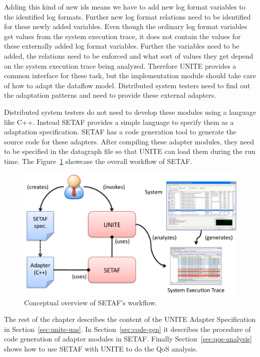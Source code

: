 Adding this kind of new ids means we have to add new log format 
variables to the identified log formats. Further new log format relations 
need to be identified for these newly added variables. Even though 
the ordinary log format variables get values from the system execution trace, 
it does not contain the values for these externally added log format 
variables.  Further the variables need to be added, the relations need 
to be enforced and what sort of values they get depend on the system 
execution trace being analyzed. Therefore UNITE provides a common 
interface for these task, but the implementation module should take 
care of how to adapt the dataflow model. Distributed system testers 
need to find out the adaptation patterns and need to provide these 
external adapters. 

Distributed system testers do not need to develop 
these modules using a language like C++. 
Instead SETAF provides a simple language 
to specify them as a adaptation specification. SETAF has a code 
generation tool to generate the source code for these adapters. After 
compiling these adapter modules, they need to be specified in the 
datagraph file so that UNITE can load them during the run time. The 
Figure~\ref{fig:setaf} showcase the overall workflow of SETAF.

\begin{figure}[htbp]
  \centering
  \includegraphics[scale=0.7]{analysis/setaf.pdf}
  \caption{Conceptual overview of SETAF's workflow.}
  \label{fig:setaf}
\end{figure}

The rest of the chapter describes the content of the UNITE Adapter 
Specification in Section~\ref{sec:unite-uas}. In Section~\ref{sec:code-gen} 
it describes the procedure of code generation of adapter modules in SETAF.
Finally Section~\ref{sec:qos-analysis} shows how to use SETAF with 
UNITE to do the QoS analysis. 

